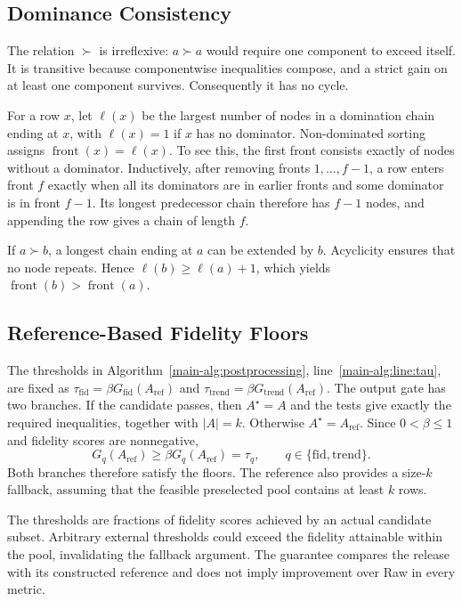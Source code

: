 \documentclass[conference]{IEEEtran}
\begin{document}
\subsection{Dominance Consistency}
\begin{IEEEproof}
The relation $\succ$ is irreflexive: $a\succ a$ would require one component to exceed itself. It is transitive because componentwise inequalities compose, and a strict gain on at least one component survives. Consequently it has no cycle.

For a row $x$, let $\ell(x)$ be the largest number of nodes in a domination chain ending at $x$, with $\ell(x)=1$ if $x$ has no dominator. Non-dominated sorting assigns $\operatorname{front}(x)=\ell(x)$. To see this, the first front consists exactly of nodes without a dominator. Inductively, after removing fronts $1,\ldots,f-1$, a row enters front $f$ exactly when all its dominators are in earlier fronts and some dominator is in front $f-1$. Its longest predecessor chain therefore has $f-1$ nodes, and appending the row gives a chain of length $f$.

If $a\succ b$, a longest chain ending at $a$ can be extended by $b$. Acyclicity ensures that no node repeats. Hence $\ell(b)\ge\ell(a)+1$, which yields $\operatorname{front}(b)>\operatorname{front}(a)$.
\end{IEEEproof}

\subsection{Reference-Based Fidelity Floors}
\begin{IEEEproof}
The thresholds in Algorithm~\ref{main-alg:postprocessing}, line~\ref{main-alg:line:tau}, are fixed as $\tau_{\mathrm{fid}}=\beta G_{\mathrm{fid}}(A_{\mathrm{ref}})$ and $\tau_{\mathrm{trend}}=\beta G_{\mathrm{trend}}(A_{\mathrm{ref}})$. The output gate has two branches. If the candidate passes, then $A^\star=A$ and the tests give exactly the required inequalities, together with $|A|=k$. Otherwise $A^\star=A_{\mathrm{ref}}$. Since $0<\beta\le1$ and fidelity scores are nonnegative,
\[
G_q(A_{\mathrm{ref}})\ge\beta G_q(A_{\mathrm{ref}})=\tau_q,
\qquad q\in\{\mathrm{fid},\mathrm{trend}\}.
\]
Both branches therefore satisfy the floors. The reference also provides a size-$k$ fallback, assuming that the feasible preselected pool contains at least $k$ rows.

The thresholds are fractions of fidelity scores achieved by an actual candidate subset. Arbitrary external thresholds could exceed the fidelity attainable within the pool, invalidating the fallback argument. The guarantee compares the release with its constructed reference and does not imply improvement over Raw in every metric.
\end{IEEEproof}
\end{document}

